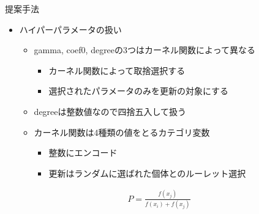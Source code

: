 \documentclass[12pt, cjk, dvipdfmx]{beamer}
\begin{document}
\begin{frame}
\begin{columns}[t]
\begin{column}{0.490\linewidth}
\begin{mybox}{提案手法}
\begin{itemize}
\begin{itemize}
                  \end{itemize}
                \item ハイパーパラメータの扱い
                  \begin{itemize} 
                  \item gamma, coef0, degreeの3つはカーネル関数によって異なる
                  \begin{itemize}
                    \item カーネル関数によって取捨選択する  
                    \item 選択されたパラメータのみを更新の対象にする
                  \end{itemize}    
                  \item degreeは整数値なので四捨五入して扱う
                  \item カーネル関数は4種類の値をとるカテゴリ変数
                  \begin{itemize}
                    \item 整数にエンコード
                    \item 更新はランダムに選ばれた個体とのルーレット選択
                  \end{itemize}
                \end{itemize}
              \end{itemize}
              \begin{align*}
                P = \frac{f(x_j)}{f(x_i)+f(x_j)}
               \end{align*}
            \end{mybox}

\end{column}
\end{columns}
\end{frame}
\end{document}
